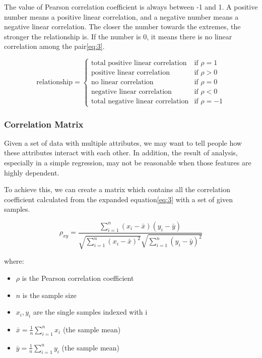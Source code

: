 \documentclass[11pt]{article} %
\theoremstyle{plain}
\theoremstyle{definition}
\begin{document}
The value of Pearson correlation coefficient is always between -1 and 1. A positive number means a positive linear correlation, and a negative number means a negative linear correlation. The closer the number towards the extremes, the stronger the relationship is. If the number is 0, it means there is no linear correlation among the pair\eqref{eq:3}.

\begin{equation}
  \label{eq:3}
  \text{relationship} = 
  \begin{cases} 
    \text{total positive linear correlation} & \text{if } \rho = 1 \\
    \text{positive linear correlation} & \text{if } \rho > 0 \\
    \text{no linear correlation} & \text{if } \rho = 0 \\
    \text{negative linear correlation} & \text{if } \rho < 0 \\
    \text{total negative linear correlation} & \text{if } \rho = -1
  \end{cases}
\end{equation}

\subsubsection{Correlation Matrix}

Given a set of data with multiple attributes, we may want to tell people how these attributes interact with each other. In addition, the result of analysis, especially in a simple regression, may not be reasonable when those features are highly dependent.

To achieve this, we can create a matrix which contains all the correlation coefficient calculated from the expanded equation\eqref{eq:3} with a set of given samples.

{
  \begin{equation}
    \label{eq:4}
    {\rho_{xy}={\frac {\sum _{i=1}^{n}(x_{i}-{\bar {x}})(y_{i}-{\bar {y}})}{{\sqrt {\sum _{i=1}^{n}(x_{i}-{\bar {x}})^{2}}}{\sqrt {\sum _{i=1}^{n}(y_{i}-{\bar {y}})^{2}}}}}}
  \end{equation}

  \footnotesize
  where:
  \begin{itemize}[label=-, leftmargin=4em, itemsep=0.1em]
    \item ${\rho}$ is the Pearson correlation coefficient
    \item ${n}$ is the sample size
    \item $x_{i}, y_{i}$ are the single samples indexed with i
    \item ${\bar {x}}={\frac {1}{n}}\sum _{i=1}^{n}x_{i}$ (the sample mean)
    \item ${\bar {y}}={\frac {1}{n}}\sum _{i=1}^{n}y_{i}$ (the sample mean)
  \end{itemize}
}
\end{document}
